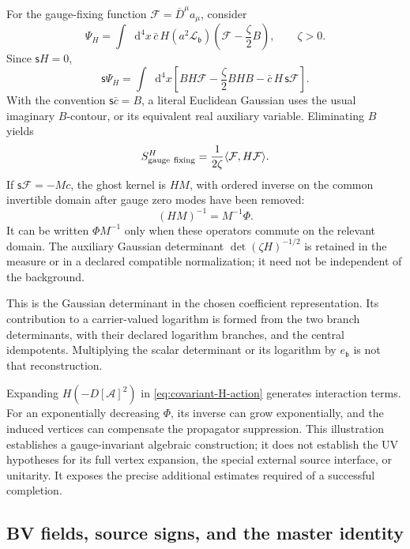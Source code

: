 \documentclass[final,5p,times,twocolumn,numbers,nopreprintline]{elsarticle}
\numberwithin{equation}{section}
\theoremstyle{definition}
\theoremstyle{remark}
\newcommand{\dd}{\mathop{}\!\mathrm d}
\newcommand{\bb}{\mathfrak b}
\newcommand{\BR}{\mathsf s}
\newcommand{\Ph}{\Phi}
\newcommand{\ee}{e_{\bb}}
\begin{document}
For the gauge-fixing function
\(\mathcal F=\overline D^\mu a_\mu\), consider
\begin{equation}
 \Psi_H=\int\dd^4x\,
 \bar c\,H(a^2\mathscr L_{\bb})
        \left(\mathcal F-\frac{\zeta}{2}B\right),
 \qquad \zeta>0.
 \label{eq:hyper-gauge-fermion}
\end{equation}
Since \(\BR H=0\),
\begin{equation}
 \BR\Psi_H
 =\int\dd^4x\left[
 B H\mathcal F-\frac{\zeta}{2}BHB
             -\bar c\,H\,\BR\mathcal F\right].
 \label{eq:hyper-gauge-expansion}
\end{equation}
With the convention \(\BR\bar c=B\), a literal Euclidean Gaussian
uses the usual imaginary \(B\)-contour, or its equivalent real
auxiliary variable. Eliminating \(B\) yields
\[
 S_{\rm gauge\ fixing}^{H}
       =\frac1{2\zeta}\langle\mathcal F,H\mathcal F\rangle .
\]
If \(\BR\mathcal F=-M c\), the ghost kernel is \(HM\), with
ordered inverse on the common invertible domain after gauge
zero modes have been removed:
\begin{equation}
 (HM)^{-1}=M^{-1}\Ph .
 \label{eq:ghost-ordering}
\end{equation}
It can be written \(\Ph M^{-1}\) only when these operators commute
on the relevant domain. The auxiliary Gaussian determinant
\(\det(\zeta H)^{-1/2}\) is retained in the measure or in a
declared compatible normalization; it need not be independent
of the background.

This is the Gaussian determinant in the chosen coefficient
representation. Its contribution to a carrier-valued logarithm is
formed from the two branch determinants, with their declared
logarithm branches, and the central idempotents. Multiplying the
scalar determinant or its logarithm by \(\ee\) is not that
reconstruction.

Expanding \(H(-D[\mathcal A]^2)\) in
\eqref{eq:covariant-H-action} generates interaction terms.
For an exponentially decreasing \(\Ph\), its inverse can grow
exponentially, and the induced vertices can compensate the
propagator suppression. This illustration establishes a
gauge-invariant algebraic construction; it does not establish the
UV hypotheses for its full vertex expansion, the special external
source interface, or unitarity. It exposes the precise additional
estimates required of a successful completion.

\subsection{BV fields, source signs, and the master identity}
\label{sec:bv}
\end{document}

